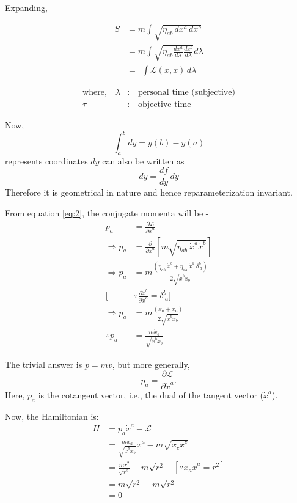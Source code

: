 \documentclass[14pt]{article} %
\begin{document}
Expanding,\\
\begin{minipage}[c]{0.5\textwidth}
\begin{align*}
    S &= m \int \sqrt{\eta_{ab} \, dx^a \, dx^b} \\
      &= m \int \sqrt{\eta_{ab} \frac{dx^a}{d\lambda} \frac{dx^b}{d\lambda}} d\lambda \\
      &= ~~\int \mathcal{L}(x, \dot{x}) \, d\lambda \tag{2} \label{eq:2}
\end{align*}
\end{minipage}
\hfill
\begin{minipage}[c]{0.45\textwidth}
\begin{align*}
    \text{where,}\quad \lambda & : \quad \text{personal time (subjective)} \\
    \tau & : \quad \text{objective time}
\end{align*}
\end{minipage}
Now, 
\[
\int_a^b dy = y(b) - y(a)
\]
represents coordinates $dy$ can also be written as $$dy = \frac{df}{dy} \, dy$$
Therefore it is geometrical in nature and hence reparameterization invariant.

From equation \eqref{eq:2}, the conjugate momenta will be -
\begin{align*}
    p_a &= \frac{\partial \mathcal{L}}{\partial \dot{x}^a} \tag{3} \label{eq:3} \\
    \Rightarrow p_a &= \frac{\partial}{\partial \dot{x}^a} \left[ m \sqrt{\eta_{ab} ~\dot{x}^a \dot{x}^b} \right] \\
    \Rightarrow p_a &= m\frac{\left( \eta_{ab}~ \dot{x}^b + \eta_{ab}~ \dot{x}^a~ \delta^b_{~a} \right)}{2 \sqrt{\dot{x}^b \dot{x}_b}} \\
    [&\because \frac{\partial \dot{x}^b}{\partial \dot{x}^a} = \delta^b_{~a}] \\
     \Rightarrow p_a &= m\frac{\left(\dot{x}_a + \dot{x}_a\right)}{2 \sqrt{\dot{x}^b \dot{x}_b}} \\
    \therefore p_a &= \frac{m\dot{x}_a}{\sqrt{\dot{x}^b \dot{x}_b}} \tag{4} \label{eq:4}
\end{align*}
\begin{tcolorbox}[ title=\textbf{Note: How are $p$ and $v$ related?}]
The trivial answer is $p = mv$, but more generally,
\[
p_a = \frac{\partial \mathcal{L}}{\partial \dot{x}^a}.
\]
Here, $p_a$ is the cotangent vector, i.e., the dual of the tangent vector ($\dot{x}^a$).
\end{tcolorbox}
Now, the Hamiltonian is:
\begin{align*}
    H &= p_a \dot{x}^a - \mathcal{L} \\
      &= \frac{m\dot{x}_a}{\sqrt{\dot{x}^b \dot{x}_b}} \dot{x}^a - m \sqrt{\dot{x}_c \dot{x}^c} \\
      &= \frac{mr^2}{\sqrt{r^2}} - m \sqrt{r^2} \quad [\because \dot{x}_a \dot{x}^a=r^2]\\
      &= m\sqrt{r^2} - m \sqrt{r^2} \\
      &= 0
\end{align*}
\end{document}
